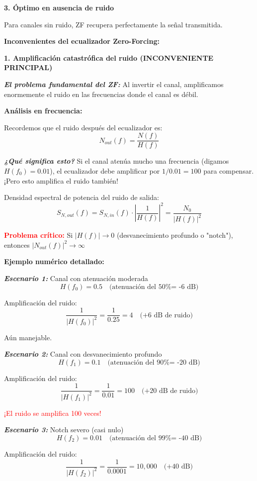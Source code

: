 \documentclass[11pt,a4paper]{article}
\begin{document}
\textbf{3. \'Optimo en ausencia de ruido}

Para canales sin ruido, ZF recupera perfectamente la se\~nal transmitida.

\vspace{0.5cm}
\textbf{Inconvenientes del ecualizador Zero-Forcing:}

\textbf{1. Amplificaci\'on catastr\'ofica del ruido (INCONVENIENTE PRINCIPAL)}

\textit{\textbf{El problema fundamental del ZF:}} Al invertir el canal, amplificamos enormemente el ruido en las frecuencias donde el canal es d\'ebil.

\textbf{An\'alisis en frecuencia:}

Recordemos que el ruido despu\'es del ecualizador es:
\[
N_{out}(f) = \frac{N(f)}{H(f)}
\]

\textit{\textbf{¿Qu\'e significa esto?}} Si el canal aten\'ua mucho una frecuencia (digamos $H(f_0) = 0.01$), el ecualizador debe amplificar por $1/0.01 = 100$ para compensar. ¡Pero esto amplifica el ruido tambi\'en!

Densidad espectral de potencia del ruido de salida:
\[
S_{N,out}(f) = S_{N,in}(f) \cdot \left|\frac{1}{H(f)}\right|^2 = \frac{N_0}{|H(f)|^2}
\]

\textbf{\textcolor{red}{Problema cr\'itico:}} Si $|H(f)| \to 0$ (desvanecimiento profundo o "notch"), entonces $|N_{out}(f)|^2 \to \infty$

\textbf{Ejemplo num\'erico detallado:}

\textit{\textbf{Escenario 1:}} Canal con atenuaci\'on moderada
\[
H(f_0) = 0.5 \quad \text{(atenuaci\'on del 50\% = -6 dB)}
\]

Amplificaci\'on del ruido:
\[
\frac{1}{|H(f_0)|^2} = \frac{1}{0.25} = 4 \quad \text{(+6 dB de ruido)}
\]

A\'un manejable.

\textit{\textbf{Escenario 2:}} Canal con desvanecimiento profundo
\[
H(f_1) = 0.1 \quad \text{(atenuaci\'on del 90\% = -20 dB)}
\]

Amplificaci\'on del ruido:
\[
\frac{1}{|H(f_1)|^2} = \frac{1}{0.01} = 100 \quad \text{(+20 dB de ruido)}
\]

\textcolor{red}{¡El ruido se amplifica 100 veces!}

\textit{\textbf{Escenario 3:}} Notch severo (casi nulo)
\[
H(f_2) = 0.01 \quad \text{(atenuaci\'on del 99\% = -40 dB)}
\]

Amplificaci\'on del ruido:
\[
\frac{1}{|H(f_2)|^2} = \frac{1}{0.0001} = 10,000 \quad \text{(+40 dB)}
\]
\end{document}
